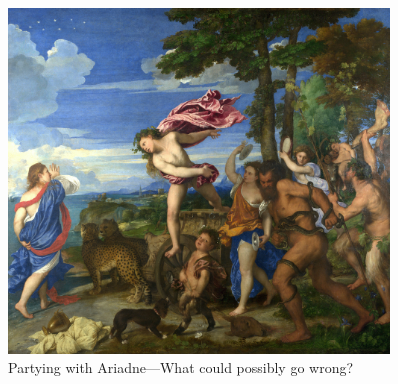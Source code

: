 \documentclass[11pt]{article}
\begin{document}
\begin{figure}[ht]
  \centering
    \includegraphics[width=0.9\textwidth]{Titian_Bacchus_and_Ariadne.jpg}
\medskip \\
{Partying with Ariadne---What could possibly go wrong?}\label{bacchus}
\end{figure}
\end{document}
